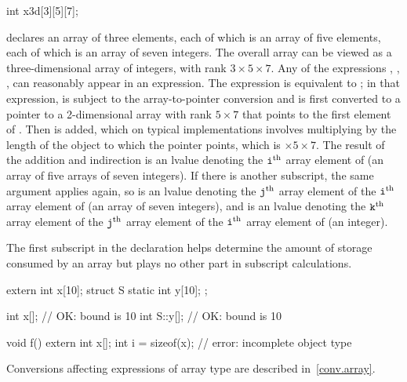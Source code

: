 \pnum
\begin{example}
\begin{codeblock}
int x3d[3][5][7];
\end{codeblock}
declares an array of three elements,
each of which is an array of five elements,
each of which is an array of seven integers.
The overall array can be viewed as a
three-dimensional array of integers,
with rank $3 \times 5 \times 7$.
Any of the expressions
,
,
,
can reasonably appear in an expression.
The expression
is equivalent to
;
in that expression,
is subject to the array-to-pointer conversion
and is first converted to
a pointer to a 2-dimensional
array with rank
$5 \times 7$
that points to the first element of .
Then  is added,
which on typical implementations involves multiplying
 by the
length of the object to which the pointer points,
which is $ \times 5 \times 7$.
The result of the addition and indirection is
an lvalue denoting
the $\texttt{i}^\text{th}$ array element of
(an array of five arrays of seven integers).
If there is another subscript,
the same argument applies again, so
 is
an lvalue denoting
the $\texttt{j}^\text{th}$ array element of
the $\texttt{i}^\text{th}$ array element of
(an array of seven integers), and
 is
an lvalue denoting
the $\texttt{k}^\text{th}$ array element of
the $\texttt{j}^\text{th}$ array element of
the $\texttt{i}^\text{th}$ array element of
(an integer).
\end{example}
\begin{note}
The first subscript in the declaration helps determine
the amount of storage consumed by an array
but plays no other part in subscript calculations.
\end{note}

\pnum
\begin{example}
\begin{codeblock}
extern int x[10];
struct S {
  static int y[10];
};

int x[];                // OK: bound is 10
int S::y[];             // OK: bound is 10

void f() {
  extern int x[];
  int i = sizeof(x);    // error: incomplete object type
}
\end{codeblock}
\end{example}

\pnum
\begin{note}
Conversions affecting expressions of array type are described in~\ref{conv.array}.
\end{note}

